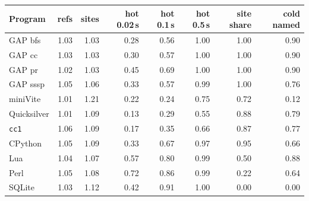 \begin{tabular}{lrrrrrrr}
\toprule
Program & refs & sites & hot 0.02\,s & hot 0.1\,s & hot 0.5\,s & site share & cold named \\
\midrule
GAP bfs & 1.03 & 1.03 & 0.28 & 0.56 & 1.00 & 1.00 & 0.90 \\
GAP cc & 1.03 & 1.03 & 0.30 & 0.57 & 1.00 & 1.00 & 0.90 \\
GAP pr & 1.02 & 1.03 & 0.45 & 0.69 & 1.00 & 1.00 & 0.90 \\
GAP sssp & 1.05 & 1.06 & 0.33 & 0.57 & 0.99 & 1.00 & 0.76 \\
miniVite & 1.01 & 1.21 & 0.22 & 0.24 & 0.75 & 0.72 & 0.12 \\
Quicksilver & 1.01 & 1.09 & 0.13 & 0.29 & 0.55 & 0.88 & 0.79 \\
\texttt{cc1} & 1.06 & 1.09 & 0.17 & 0.35 & 0.66 & 0.87 & 0.77 \\
CPython & 1.05 & 1.09 & 0.33 & 0.67 & 0.97 & 0.95 & 0.66 \\
Lua & 1.04 & 1.07 & 0.57 & 0.80 & 0.99 & 0.50 & 0.88 \\
Perl & 1.05 & 1.08 & 0.72 & 0.86 & 0.99 & 0.22 & 0.64 \\
SQLite & 1.03 & 1.12 & 0.42 & 0.91 & 1.00 & 0.00 & 0.00 \\
\bottomrule
\end{tabular}
